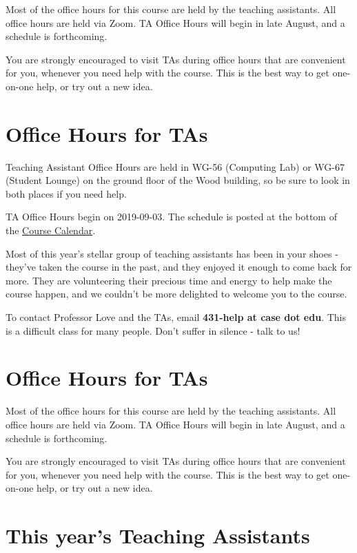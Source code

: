 \documentclass[
]{book}
\begin{document}
Most of the office hours for this course are held by the teaching assistants. All office hours are held via Zoom. TA Office Hours will begin in late August, and a schedule is forthcoming.

You are strongly encouraged to visit TAs during office hours that are convenient for you, whenever you need help with the course. This is the best way to get one-on-one help, or try out a new idea.

\hypertarget{office-hours-for-tas-1}{%
\section{Office Hours for TAs}\label{office-hours-for-tas-1}}

Teaching Assistant Office Hours are held in WG-56 (Computing Lab) or WG-67 (Student Lounge) on the ground floor of the Wood building, so be sure to look in both places if you need help.

TA Office Hours begin on 2019-09-03. The schedule is posted at the bottom of the \href{https://github.com/THOMASELOVE/2019-431/blob/master/calendar.md}{Course Calendar}.

Most of this year's stellar group of teaching assistants has been in your shoes - they've taken the course in the past, and they enjoyed it enough to come back for more. They are volunteering their precious time and energy to help make the course happen, and we couldn't be more delighted to welcome you to the course.

To contact Professor Love and the TAs, email \textbf{431-help at case dot edu}. This is a difficult class for many people. Don't suffer in silence - talk to us!

\hypertarget{office-hours-for-tas-2}{%
\section{Office Hours for TAs}\label{office-hours-for-tas-2}}

Most of the office hours for this course are held by the teaching assistants. All office hours are held via Zoom. TA Office Hours will begin in late August, and a schedule is forthcoming.

You are strongly encouraged to visit TAs during office hours that are convenient for you, whenever you need help with the course. This is the best way to get one-on-one help, or try out a new idea.

\hypertarget{this-years-teaching-assistants}{%
\section{This year's Teaching Assistants}\label{this-years-teaching-assistants}}
\end{document}
